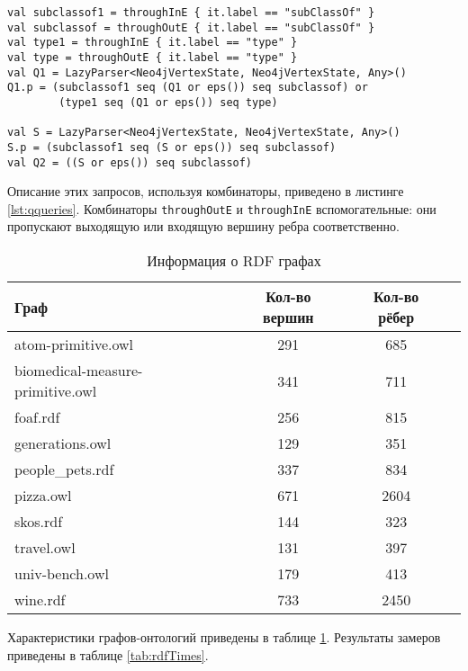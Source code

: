 \begin{lstlisting}[float=h, label=lst:qqueries, caption={Запросы, используя комбинаторы}]
val subclassof1 = throughInE { it.label == "subClassOf" }
val subclassof = throughOutE { it.label == "subClassOf" }
val type1 = throughInE { it.label == "type" }
val type = throughOutE { it.label == "type" }
val Q1 = LazyParser<Neo4jVertexState, Neo4jVertexState, Any>()
Q1.p = (subclassof1 seq (Q1 or eps()) seq subclassof) or
        (type1 seq (Q1 or eps()) seq type)

val S = LazyParser<Neo4jVertexState, Neo4jVertexState, Any>()
S.p = (subclassof1 seq (S or eps()) seq subclassof)
val Q2 = ((S or eps()) seq subclassof)
\end{lstlisting}

Описание этих запросов, используя комбинаторы, приведено в листинге \ref{lst:qqueries}. Комбинаторы \texttt{throughOutE} и \texttt{throughInE} вспомогательные: они пропускают выходящую или входящую вершину ребра соответственно.

\begin{table}[h]
    \caption{Информация о RDF графах}
    \begin{tabular}{|l|c|c|c|}
        \hline
        \textbf{Граф} & \textbf{Кол-во вершин} & \textbf{Кол-во рёбер} \\
        \hline
        atom-primitive.owl & 291 & 685 \\
        biomedical-measure-primitive.owl & 341 & 711 \\
        foaf.rdf & 256 & 815 \\
        generations.owl & 129 & 351 \\
        people\_pets.rdf & 337 & 834 \\
        pizza.owl & 671 & 2604 \\
        skos.rdf & 144 & 323 \\
        travel.owl & 131 & 397 \\
        univ-bench.owl & 179 & 413 \\
        wine.rdf & 733 & 2450 \\
        \hline
\end{tabular}
\label{tab:rdfGraphs}
\end{table}

Характеристики графов-онтологий приведены в таблице \ref{tab:rdfGraphs}. Результаты  замеров приведены в таблице \ref{tab:rdfTimes}. 

